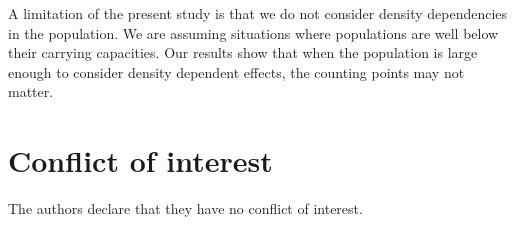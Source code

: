\documentclass[smallextended]{svjour3}
\begin{document}
A limitation of the present study is that we do not consider density dependencies in the population. We are assuming situations where populations are well below their carrying capacities. Our results show that when the population is large enough to consider density dependent effects, the counting points may not matter.


%
 \section*{Conflict of interest}
%
 The authors declare that they have no conflict of interest.


\nocite{*}
%
%
\end{document}
